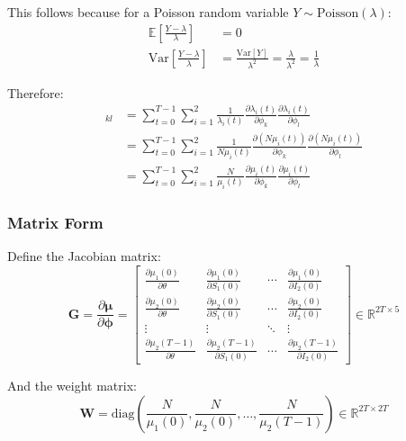 This follows because for a Poisson random variable $Y \sim \text{Poisson}(\lambda)$:
\begin{align}
\mathbb{E}\left[\frac{Y - \lambda}{\lambda}\right] &= 0 \\
\text{Var}\left[\frac{Y - \lambda}{\lambda}\right] &= \frac{\text{Var}[Y]}{\lambda^2} = \frac{\lambda}{\lambda^2} = \frac{1}{\lambda}
\end{align}

Therefore:
\begin{align}
[\mathbf{J}]_{kl} &= \sum_{t=0}^{T-1}\sum_{i=1}^{2} \frac{1}{\lambda_i(t)} \frac{\partial \lambda_i(t)}{\partial \phi_k}\frac{\partial \lambda_i(t)}{\partial \phi_l} \\
&= \sum_{t=0}^{T-1}\sum_{i=1}^{2} \frac{1}{N \mu_i(t)} \frac{\partial (N \mu_i(t))}{\partial \phi_k}\frac{\partial (N \mu_i(t))}{\partial \phi_l} \\
&= \sum_{t=0}^{T-1}\sum_{i=1}^{2} \frac{N}{\mu_i(t)} \frac{\partial \mu_i(t)}{\partial \phi_k}\frac{\partial \mu_i(t)}{\partial \phi_l}
\end{align}

\subsubsection{Matrix Form}

Define the Jacobian matrix:
\begin{equation}
\mathbf{G} = \frac{\partial \boldsymbol{\mu}}{\partial \boldsymbol{\phi}} =  \begin{bmatrix}
\frac{\partial \mu_1(0)}{\partial \theta} & \frac{\partial \mu_1(0)}{\partial S_1(0)} & \cdots & \frac{\partial \mu_1(0)}{\partial I_2(0)} \\
\frac{\partial \mu_2(0)}{\partial \theta} & \frac{\partial \mu_2(0)}{\partial S_1(0)} & \cdots & \frac{\partial \mu_2(0)}{\partial I_2(0)} \\
\vdots & \vdots & \ddots & \vdots \\
\frac{\partial \mu_2(T-1)}{\partial \theta} & \frac{\partial \mu_2(T-1)}{\partial S_1(0)} & \cdots & \frac{\partial \mu_2(T-1)}{\partial I_2(0)}
\end{bmatrix} \in \mathbb{R}^{2T \times 5}
\end{equation}

And the weight matrix:
\begin{equation}
\mathbf{W} = \text{diag}\left(\frac{N}{\mu_1(0)}, \frac{N}{\mu_2(0)}, \ldots, \frac{N}{\mu_2(T-1)}\right) \in \mathbb{R}^{2T \times 2T}
\end{equation}


